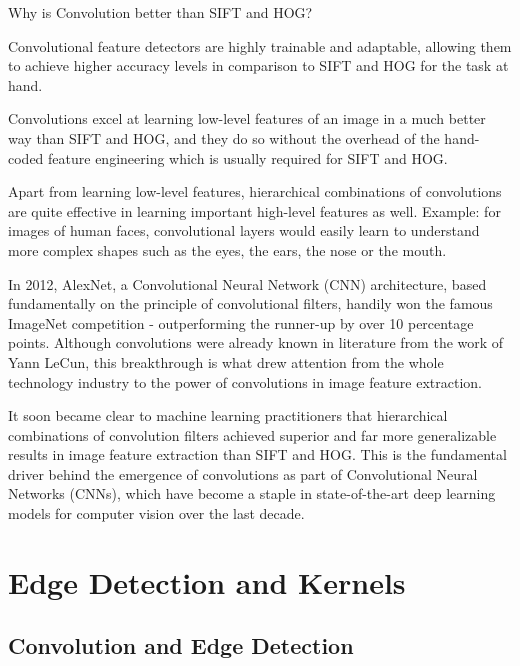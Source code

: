 Why is Convolution better than SIFT and HOG?
	\begin{bulletedlist}
		\item Convolutional feature detectors are highly trainable and adaptable, allowing them to achieve higher accuracy levels in comparison to SIFT and HOG for the task at hand.
		\item Convolutions excel at learning low-level features of an image in a much better way than SIFT and HOG, and they do so without the overhead of the hand-coded feature engineering which is usually required for SIFT and HOG.
		\item Apart from learning low-level features, hierarchical combinations of convolutions are quite effective in learning important high-level features as well.  Example: for images of human faces, convolutional layers would easily learn to understand more
complex shapes such as the eyes, the ears, the nose or the mouth.
		\item In 2012, AlexNet, a Convolutional Neural Network (CNN) architecture, based fundamentally on the principle of convolutional filters, handily won the famous ImageNet competition - outperforming the runner-up by over 10 percentage points.  Although convolutions were already known in literature from the work of Yann LeCun, this breakthrough is what drew attention from the whole technology industry to the power of convolutions in image feature extraction.
		\item It soon became clear to machine learning practitioners that hierarchical combinations of convolution filters achieved superior and far more generalizable results in image feature extraction than SIFT and HOG. This is the fundamental driver behind the emergence of convolutions as part of Convolutional Neural Networks (CNNs), which have become a staple in state-of-the-art deep learning models for computer vision over the last decade.
	\end{bulletedlist}



	\section{Edge Detection and Kernels}
	\subsection{Convolution and Edge Detection}
